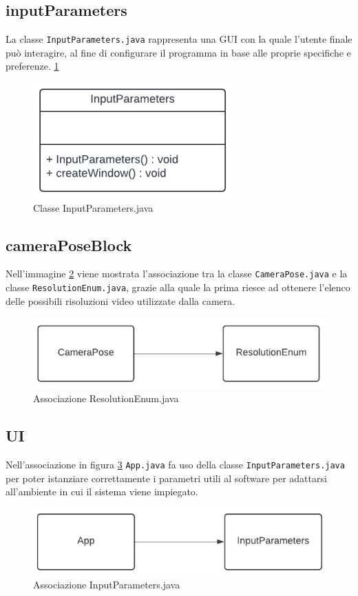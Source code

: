 \documentclass[12pt,a4paper,openright,twoside]{book}
\begin{document}
\subsection{inputParameters}
La classe \texttt{InputParameters.java} rappresenta una GUI con la quale l'utente finale può interagire, al fine di configurare il programma in base alle proprie specifiche e preferenze. \ref{fig:input_parameters}
\begin{figure}
	\centering
	\includegraphics[width=0.5\linewidth]{./figures/UML/inputParameters.png}
	\caption{Classe InputParameters.java}
	\label{fig:input_parameters}
\end{figure}
\subsection{cameraPoseBlock}
Nell'immagine \ref{fig:camera_pose_block} viene mostrata l'associazione tra la classe \texttt{CameraPose.java} e la classe \texttt{ResolutionEnum.java}, grazie alla quale la prima riesce ad ottenere l'elenco delle possibili risoluzioni video utilizzate dalla camera.
\begin{figure}
	\centering
	\includegraphics[width=0.5\linewidth]{./figures/UML/cameraPoseBlock.png}
	\caption{Associazione ResolutionEnum.java}
	\label{fig:camera_pose_block}
\end{figure}
\subsection{UI}
Nell'associazione in figura \ref{fig:UI} \texttt{App.java} fa uso della classe \texttt{InputParameters.java} per poter istanziare correttamente i parametri utili al software per adattarsi all'ambiente in cui il sistema viene impiegato.
\begin{figure}
	\centering
	\includegraphics[width=0.5\linewidth]{./figures/UML/UI.png}
	\caption{Associazione InputParameters.java}
	\label{fig:UI}
\end{figure}
\end{document}
